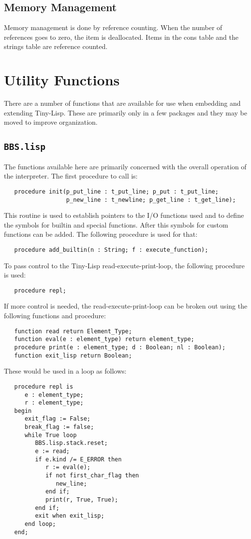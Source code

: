 \documentclass[10pt, openany]{book}
\newcommand{\package}[1]{\texttt{#1}}
\newcommand{\tl}{Tiny-Lisp}
\begin{document}
\subsection{Memory Management}
Memory management is done by reference counting.  When the number of references goes to zero, the item is deallocated.  Items in the cons table and the strings table are reference counted.

\section{Utility Functions}
There are a number of functions that are available for use when embedding and extending \tl{}.  These are primarily only in a few packages and they may be moved to improve organization.
\subsection{\package{BBS.lisp}}
The functions available here are primarily concerned with the overall operation of the interpreter.  The first procedure to call is:
\begin{lstlisting}
   procedure init(p_put_line : t_put_line; p_put : t_put_line;
                  p_new_line : t_newline; p_get_line : t_get_line);
\end{lstlisting}
This routine is used to establish pointers to the I/O functions used and to define the symbols for builtin and special functions.  After this symbols for custom functions can be added.  The following procedure is used for that:
\begin{lstlisting}
   procedure add_builtin(n : String; f : execute_function);
\end{lstlisting}
To pass control to the \tl{} read-execute-print-loop, the following procedure is used:
\begin{lstlisting}
   procedure repl;
\end{lstlisting}
If more control is needed, the read-execute-print-loop can be broken out using the following functions and procedure:
\begin{lstlisting}
   function read return Element_Type;
   function eval(e : element_type) return element_type;
   procedure print(e : element_type; d : Boolean; nl : Boolean);
   function exit_lisp return Boolean;
\end{lstlisting}
These would be used in a loop as follows:
\begin{lstlisting}
   procedure repl is
      e : element_type;
      r : element_type;
   begin
      exit_flag := False;
      break_flag := false;
      while True loop
         BBS.lisp.stack.reset;
         e := read;
         if e.kind /= E_ERROR then
            r := eval(e);
            if not first_char_flag then
               new_line;
            end if;
            print(r, True, True);
         end if;
         exit when exit_lisp;
      end loop;
   end;
\end{lstlisting}
\end{document}
